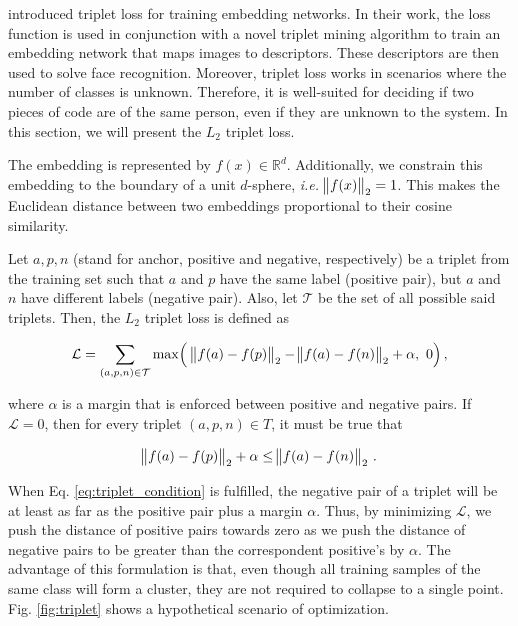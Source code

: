  introduced triplet loss for training embedding networks. In their work, the loss function is used in conjunction with a novel triplet mining algorithm to train an embedding network that maps images to descriptors. These descriptors are then used to solve face recognition. Moreover, triplet loss works in scenarios where the number of classes is unknown. Therefore, it is well-suited for deciding if two pieces of code are of the same person, even if they are unknown to the system. In this section, we will present the $L_2$ triplet loss.

The embedding is represented by $f(x) \in \mathbb{R}^d$. Additionally, we constrain this embedding to the boundary of a unit $d$-sphere, \textit{i.e.} $\norm{f(x)}_2 = 1$. This makes the Euclidean distance between two embeddings proportional to their cosine similarity.

Let $a, p, n$ (stand for anchor, positive and negative, respectively) be a triplet from the training set such that $a$ and $p$ have the same label (positive pair), but $a$ and $n$ have different labels (negative pair). Also, let $\mathcal{T}$ be the set of all possible said triplets. Then, the $L_2$ triplet loss is defined as

\begin{equation}\label{eq:triplet}
\mathcal{L} = \sum_{(a, p, n) \in \mathcal{T}} %
\max\Bigl(\ \norm{f(a) - f(p)}_2 - \norm{f(a) - f(n)}_2 + \alpha,\ 0\Bigr)\,,
\end{equation}

\noindent where $\alpha$ is a margin that is enforced between positive and negative pairs. If $\mathcal{L} = 0$, then for every triplet $(a, p, n) \in T$, it must be true that

\begin{equation}\label{eq:triplet_condition}
\norm{f(a) - f(p)}_2 + \alpha \leq \norm{f(a) - f(n)}_2 \,.
\end{equation}

When Eq. \ref{eq:triplet_condition} is fulfilled, the negative pair of a triplet will be at least as far as the positive pair plus a margin $\alpha$. Thus, by minimizing $\mathcal{L}$, we push the distance of positive pairs towards zero as we push the distance of negative pairs to be greater than the correspondent positive's by $\alpha$. The advantage of this formulation is that, even though all training samples of the same class will form a cluster, they are not required to collapse to a single point. Fig. \ref{fig:triplet} shows a hypothetical scenario of optimization.

